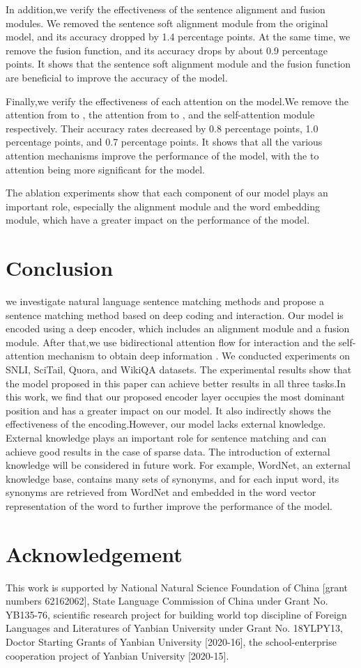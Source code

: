 \documentclass[review]{elsarticle}
\begin{document}
In addition,we verify the effectiveness of the sentence alignment and fusion modules. We removed the sentence soft alignment module from the original model, and its accuracy dropped by 1.4 percentage points. At the same time, we remove the fusion function, and its accuracy drops by about 0.9 percentage points. It shows that the sentence soft alignment module and the fusion function are beneficial to improve the accuracy of the model.

Finally,we verify the effectiveness of each attention on the model.We remove the attention from  to , the attention from  to , and the self-attention module respectively. Their accuracy rates decreased by 0.8 percentage points, 1.0 percentage points, and 0.7 percentage points. It shows that all the various attention mechanisms improve the performance of the model, with the  to  attention being more significant for the model.

The ablation experiments show that each component of our model plays an important role, especially the alignment module and the word embedding module, which have a greater impact on the performance of the model.
\section{Conclusion}
we investigate natural language sentence matching methods and propose a sentence matching method based on deep coding and interaction. Our model is encoded using a deep encoder, which includes an alignment module and a fusion module. After that,we use bidirectional attention flow for interaction  and  the self-attention mechanism  to obtain deep information . We conducted experiments on SNLI, SciTail, Quora, and WikiQA datasets. The experimental results show that the model proposed in this paper can achieve better results in all three tasks.In this work, we find that our proposed encoder layer occupies the most dominant position and has a greater impact on our model. It also indirectly shows the effectiveness of the encoding.However, 
our model lacks external knowledge. External knowledge plays an important role for sentence matching and can achieve good results in the case of sparse data. The introduction of external knowledge will be considered in future work. For example, WordNet, an external knowledge base, contains many sets of synonyms, and for each input word, its synonyms are retrieved from WordNet and embedded in the word vector representation of the word to further improve the performance of the model.
\section*{Acknowledgement}
This work is supported by National Natural Science Foundation of China [grant numbers 62162062], State Language Commission of China under Grant No. YB135-76, scientific research project for building world top discipline of Foreign Languages and Literatures of Yanbian University under Grant No. 18YLPY13, Doctor Starting Grants of Yanbian University [2020-16], the school-enterprise cooperation project of Yanbian University [2020-15].
\end{document}
